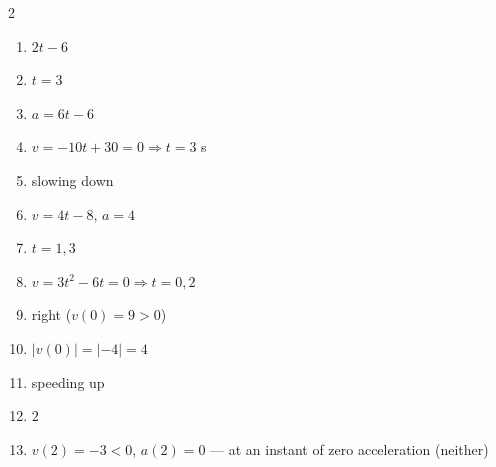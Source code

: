 \documentclass[11pt]{article}
\begin{document}
\begin{keybox}
\begin{multicols}{2}
\small
\begin{enumerate}[leftmargin=*,itemsep=3pt]
  \item $2t-6$
  \item $t=3$
  \item $a=6t-6$
  \item $v=-10t+30=0\Rightarrow t=3$ s
  \item slowing down
  \item $v=4t-8$, $a=4$
  \item $t=1,3$
  \item $v=3t^2-6t=0\Rightarrow t=0,2$
  \item right ($v(0)=9>0$)
  \item $|v(0)|=|-4|=4$
  \item speeding up
  \item $2$
  \item $v(2)=-3<0$, $a(2)=0$ — at an instant of zero acceleration (neither)
\end{enumerate}
\end{multicols}
\end{keybox}
\end{document}
